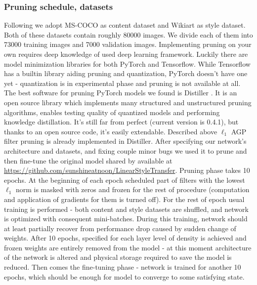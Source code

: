 \documentclass[../Main.tex]{subfiles}
\begin{document}
    \subsubsection{Pruning schedule, datasets} 
    Following \cite{Li2018} we adopt MS-COCO \cite{mscoco} as content dataset and Wikiart \cite{wikiart}
    as style dataset. Both of these datasets contain roughly 80000 images. We divide each of them 
    into 73000 training images and 7000 validation images. Implementing pruning on your own
    requires deep knowledge of used deep learning framework. Luckily there are model 
    minimization libraries for both PyTorch and Tensorflow. While Tensorflow has 
    a builtin library aiding pruning and quantization, PyTorch doesn't have one yet - 
    quantization is in experimental phase and pruning is not available at all. The best 
    software for pruning PyTorch models we found is Distiller \cite{distiller}.
    It is an open source library which implements many structured and unstructured
    pruning algorithms, enables testing quality of quantized models and performing
    knowledge distillation. It's still far from perfect (current version is 0.4.1), but 
    thanks to an open source code, it's easily extendable. Described above
    $\ell_1$ AGP filter pruning is already implemented in Distiller. After specifying
    our network's architecture and datasets, and fixing couple minor bugs 
    we used it to prune and then fine-tune the 
    original model shared by \cite{Li2018} available at
    \url{https://github.com/sunshineatnoon/LinearStyleTransfer}. 
    Pruning phase takes 10 epochs. At the beginning of each epoch scheduled part of filters
    with the lowest $\ell_1$ norm is masked with zeros and frozen for the rest of procedure
    (computation and application of gradients for them is turned off). For the rest of 
    epoch usual training is performed - both content and style datasets are shuffled,
    and network is optimized with consequent mini-batches. During this training,
    network should at least partially recover from performance drop caused by sudden
    change of weights. After 10 epochs, specified 
    for each layer level of density is achieved and frozen weights are entirely removed
    from the model - at this moment architecture of the network is altered and physical
    storage required to save the model is reduced. Then comes the fine-tuning phase - 
    network is trained for another
    10 epochs, which should be enough for model to converge to some satisfying state.
    
\end{document}
